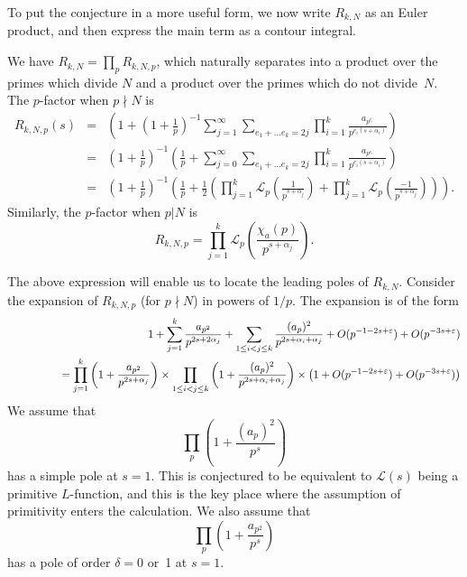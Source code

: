 \documentclass[12pt,letterpaper]{amsart}
\theoremstyle{plain}
\theoremstyle{definition}
\theoremstyle{remark}
\numberwithin{equation}{subsection}
\numberwithin{theorem}{subsection}
\numberwithin{table}{subsection}
\begin{document}
To put the conjecture in a more useful form, we now write $R_{k,N}$ as an 
Euler product, and then express the main term as a contour
integral.

We have $R_{k,N}=\prod_p R_{k,N,p}$,
which naturally separates into a product  over the primes which
divide $N$ and a product over the primes which do not divide~$N$.
The $p$-factor when $p\nmid N$ is 
\begin{eqnarray}
R_{k,N,p}(s)&  = &
 \left(1+ \left(1+\frac 1 p \right)^{-1}\sum_{j=1}^\infty
\sum_{e_1+\dots e_k=2j}\prod_{i=1}^k
\frac{a_{p^{e_i}}}{p^{e_i(s +\alpha_i)}} \right)\nonumber \\
&  = &
\left(1+\frac 1 p\right)^{-1} \left(\frac{1}{p}+
\sum_{j=0}^\infty\sum_{e_1+\dots e_k=2j}
\prod_{i=1}^k \frac{a_{p^{e_i}}}{p^{e_i(s +\alpha_i)}} \right)\nonumber \\
&  = &\left(1+\frac 1 p\right)^{-1}\left(\frac 1 p +\frac{1}{2}
\left(\prod_{j=1}^k
\mathcal{L}_p \left(\frac{1}{p^{s +\alpha_j}} \right)+ 
\prod_{j=1}^k\mathcal{L}_p
\left(\frac{-1}{p^{s +\alpha_j}}\right) \right)\right)
. \end{eqnarray}
Similarly, the $p$-factor when $p| N$ is
\begin{equation}
    R_{k,N,p}=
        \prod_{j=1}^k 
        \mathcal{L}_p \left(\frac{\chi_a(p)}{p^{s +\alpha_j}} \right).
\label{eqn:RNp}
\end{equation}


The above expression will enable us to locate the leading poles of $R_{k,N}$.
Consider the expansion of $R_{k,N,p}$ (for $p\nmid N$) in powers of $1/p$.
The expansion is of the form
\begin{eqnarray}\label{eqn:RNp1overp}
&&1+  \sum_{j=1}^k \frac{a_{p^2}}{p^{2s+2\alpha_j}}+
\sum_{1\le i < j \le k} \frac {(a_p)^2}{p^{2s+\alpha_i+\alpha_j}} + 
O(p^{-1-2s+\varepsilon})+O(p^{-3s+\varepsilon} )\cr
&&\phantom{XXXX}= 
\prod_{j=1}^k
\left(1+\frac{a_{p^2}}{p^{2s+\alpha_j}}\right)
\times
\prod_{1\le i < j \le k}
\left(1+\frac{(a_p)^2}{p^{2s+\alpha_i+\alpha_j}}\right)
\times
\left(1+O(p^{-1-2s+\varepsilon})+O(p^{-3s+\varepsilon} )\right)
\end{eqnarray}
We assume that
\begin{equation}\prod_p\left(1+\frac{(a_p)^2}{p^s}\right)
\label{eqn:squareofap}
\end{equation}
has a simple pole at $s=1$.  This is conjectured to be equivalent to
$\mathcal{L}(s)$ being a primitive $L$-function, and this is the
key place where the assumption of primitivity enters the calculation.
We also assume that
\begin{equation}\prod_p\left(1+\frac{a_{p^2}}{p^s}\right)
\end{equation}
has a pole of order $\delta=0$ or~1 at $s=1$.
\end{document}
